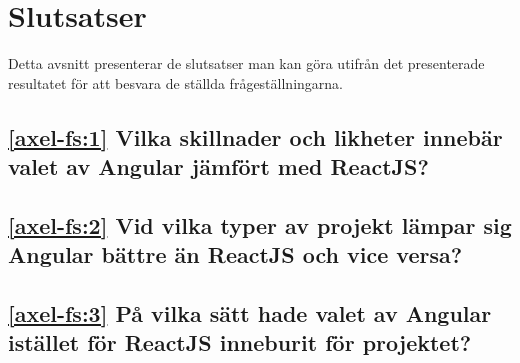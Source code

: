\section{Slutsatser}
\label{sec:axel-conclusion}

Detta avsnitt presenterar de slutsatser man kan göra utifrån det presenterade resultatet för att besvara de ställda frågeställningarna.

\subsection*{\ref{axel-fs:1} Vilka skillnader och likheter innebär valet av Angular jämfört med ReactJS?}

\subsection*{\ref{axel-fs:2} Vid vilka typer av projekt lämpar sig Angular bättre än ReactJS och vice versa?}
 
\subsection*{\ref{axel-fs:3} På vilka sätt hade valet av Angular istället för ReactJS inneburit för projektet?}
